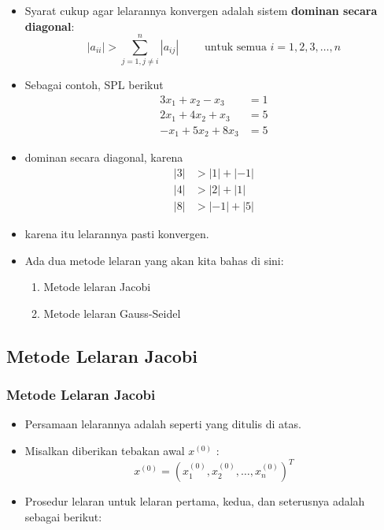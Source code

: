 \documentclass[pdflatex,compress,mathserif]{beamer}
\begin{document}
\begin{frame}
	\begin{itemize}
		\item Syarat cukup agar lelarannya konvergen adalah sistem \textbf{dominan secara diagonal}:
		\[ \left| a_{ii} \right| > \sum_{j=1,j \neq i}^{n} \left| a_{ij} \right| \qquad \text{ untuk semua } i = 1,2,3,\dots,n \]
		\item Sebagai contoh, SPL berikut
		\begin{align*}
			3x_1 + x_2 - x_3 &= 1 \\
			2x_1 + 4x_2 + x_3 &= 5 \\
			-x_1 + 5x_2 + 8x_3 &= 5
		\end{align*}
	\end{itemize}
\end{frame}

\begin{frame}
	\begin{itemize}
		\item dominan secara diagonal, karena
		\begin{align*}
		|3| &> |1| + |-1| \\
		|4| &> |2| + |1| \\
		|8| &> |-1| + |5|
		\end{align*}
		\item karena itu lelarannya pasti konvergen.
		\item Ada dua metode lelaran yang akan kita bahas di sini:
		\begin{enumerate}
			\item Metode lelaran Jacobi
			\item Metode lelaran Gauss-Seidel
		\end{enumerate}
	\end{itemize}
\end{frame}

\subsection{Metode Lelaran Jacobi}

\begin{frame}
	\frametitle{Metode Lelaran Jacobi}
	\begin{itemize}
		\item Persamaan lelarannya adalah seperti yang ditulis di atas.
		\item Misalkan diberikan tebakan awal $ x^{(0)} $ :
		\[ x^{(0)} = (x_1^{(0)}, x_2^{(0)}, \dots , x_n^{(0)})^T \]
		\item Prosedur lelaran untuk lelaran pertama, kedua, dan seterusnya adalah sebagai berikut:
	\end{itemize}
\end{frame}
\end{document}
